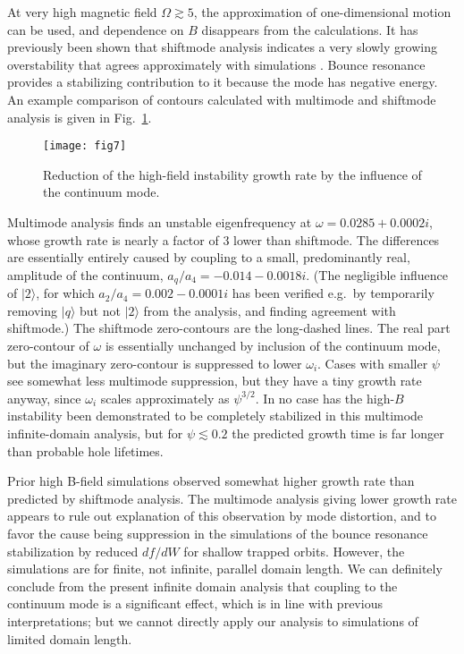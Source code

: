 \documentclass{jpp}
\def\ket#1{|#1\rangle}
\begin{document}
At very high magnetic field $\Omega\gtrsim5$, the approximation of
one-dimensional motion can be used, and dependence on $B$ disappears
from the calculations. It has previously been shown that shiftmode
analysis indicates a very slowly growing overstability that agrees
approximately with simulations
\citep{Hutchinson2019a}. Bounce resonance provides a stabilizing
contribution to it because the mode has negative energy.  An example
comparison of contours calculated with multimode and shiftmode
analysis is given in Fig.\ \ref{hiB}.
\begin{figure}
  \center  \texttt{[image: fig7]}
  \caption{Reduction of the high-field instability growth rate by the
    influence of the continuum mode.\label{hiB}}
\end{figure}
Multimode analysis finds an unstable eigenfrequency at
$\omega=0.0285+0.0002i$, whose growth rate is nearly a factor of 3
lower than shiftmode.  The differences are essentially entirely caused
by coupling to a small, predominantly real, amplitude of the
continuum, $a_q/a_4=-0.014-0.0018i$. (The negligible influence of
$\ket{2}$, for which $a_2/a_4=0.002-0.0001i$ has been verified e.g.\
by temporarily removing $\ket{q}$ but not $\ket{2}$ from the analysis,
and finding agreement with shiftmode.)  The shiftmode zero-contours
are the long-dashed lines. The real part zero-contour of $\omega$ is
essentially unchanged by inclusion of the continuum mode, but the
imaginary zero-contour is suppressed to lower $\omega_i$. Cases with
smaller $\psi$ see somewhat less multimode suppression, but they
have a tiny growth rate anyway, since
$\omega_i$ scales approximately as $\psi^{3/2}$.  In no case has the
high-$B$ instability been demonstrated to be completely stabilized in this
multimode infinite-domain analysis, but for $\psi\lesssim0.2$ the
predicted growth time is far longer than probable hole lifetimes.

Prior high B-field simulations observed somewhat higher growth rate
than predicted by shiftmode analysis.  The multimode analysis giving
lower growth rate appears to rule out explanation of this observation
by mode distortion, and to favor the cause being suppression in the
simulations of the bounce resonance stabilization by reduced $df/dW$
for shallow trapped orbits. However, the simulations are for finite,
not infinite, parallel domain length.  We can definitely conclude from
the present infinite domain analysis that coupling to the continuum
mode is a significant effect, which is in line with previous
interpretations; but we cannot directly apply our analysis to
simulations of limited domain length.
\end{document}

